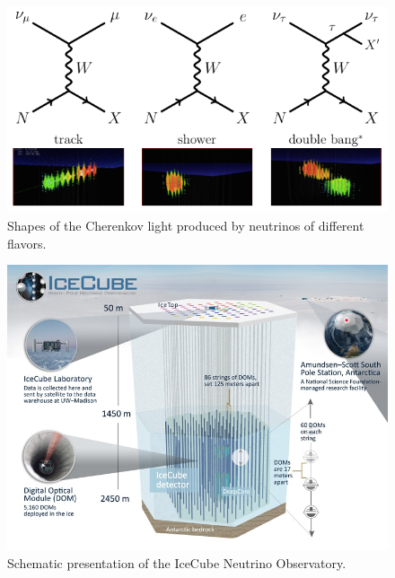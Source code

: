 \begin{figure}
  \centering
  \includegraphics[width=\textwidth]{content/img/flavors1.png}
  \caption{
    Shapes of the Cherenkov light produced by neutrinos of different flavors.
    \citationneeded
  }
  \label{fig:img:icecube:interactions}
\end{figure}

\begin{figure}
  \centering
  \includegraphics[width=\textwidth]{content/img/icecube_detector_schematic.jpg}
  \caption{
    Schematic presentation of the IceCube Neutrino Observatory. \cite{icecube_homepage}
  }
  \label{fig:img:icecube}
\end{figure}
